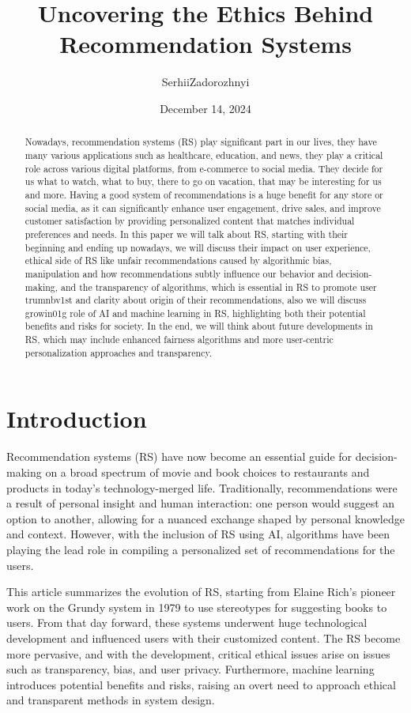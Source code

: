 \documentclass{article}
\title{Uncovering the Ethics Behind Recommendation Systems}
\author{Serhii\;Zadorozhnyi}
\date{December 14, 2024}
\begin{document}
\maketitle
\textbf{}

\begin{abstract}
Nowadays, recommendation systems (RS) play significant part in our lives, they have many various applications such as healthcare, education, and news, they play a critical role across various digital platforms, from e-commerce to social media. They decide for us what to watch, what to buy, there to go on vacation, that may be interesting for us and more. Having a good system of recommendations is a huge benefit for any store or social media, as it can significantly enhance user engagement, drive sales, and improve customer satisfaction by providing personalized content that matches individual preferences and needs. In this paper we will talk about RS, starting with their beginning and ending up nowadays, we will discuss their impact on user experience, ethical side of RS like unfair recommendations caused by algorithmic bias, manipulation and how recommendations subtly influence our behavior and decision-making, and the transparency of algorithms, which is essential in RS to promote user trumnbv1st and clarity about origin of their recommendations, also we will discuss growin01g role of AI and machine learning in RS, highlighting both their potential benefits and risks for society. In the end, we will think about future developments in RS, which may include enhanced fairness algorithms and more user-centric personalization approaches and transparency.
\end{abstract}

\section{Introduction}
Recommendation systems (RS) have now become an essential guide for decision-making on a broad spectrum of movie and book choices to restaurants and products in today's technology-merged life. Traditionally, recommendations were a result of personal insight and human interaction: one person would suggest an option to another, allowing for a nuanced exchange shaped by personal knowledge and context. However, with the inclusion of RS using AI, algorithms have been playing the lead role in compiling a personalized set of recommendations for the users.

This article summarizes the evolution of RS, starting from Elaine Rich's pioneer work on the Grundy system in 1979 \cite{F_RS} to use stereotypes for suggesting books to users. From that day forward, these systems underwent huge technological development and influenced users with their customized content. The RS become more pervasive, and with the development, critical ethical issues arise on issues such as transparency, bias, and user privacy. Furthermore, machine learning introduces potential benefits and risks, raising an overt need to approach ethical and transparent methods in system design.
\end{document}
